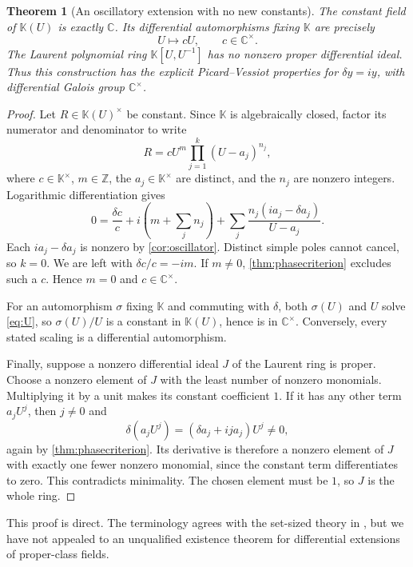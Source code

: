 \documentclass[11pt,letterpaper]{article}
\numberwithin{equation}{section}
\newtheorem{theorem}{Theorem}[section]
\theoremstyle{definition}
\theoremstyle{remark}
\newcommand{\K}{\mathbb K}
\newcommand{\C}{\mathbb C}
\newcommand{\Z}{\mathbb Z}
\begin{document}
\begin{theorem}[An oscillatory extension with no new constants]\label{thm:extension}
The constant field of $\K(U)$ is exactly $\C$. Its differential automorphisms fixing $\K$ are precisely
\[
 U\longmapsto cU,\qquad c\in\C^\times.
\]
The Laurent polynomial ring $\K[U,U^{-1}]$ has no nonzero proper differential ideal. Thus this construction has the explicit Picard--Vessiot properties for $\delta y=iy$, with differential Galois group $\C^\times$.
\end{theorem}
\begin{proof}
Let $R\in\K(U)^\times$ be constant. Since $\K$ is algebraically closed, factor its numerator and denominator to write
\[
 R=cU^m\prod_{j=1}^k(U-a_j)^{n_j},
\]
where $c\in\K^\times$, $m\in\Z$, the $a_j\in\K^\times$ are distinct, and the $n_j$ are nonzero integers. Logarithmic differentiation gives
\begin{equation}\label{eq:rationalconstant}
 0=\frac{\delta c}{c}
   +i\left(m+\sum_j n_j\right)
   +\sum_j\frac{n_j(ia_j-\delta a_j)}{U-a_j}.
\end{equation}
Each $ia_j-\delta a_j$ is nonzero by \cref{cor:oscillator}. Distinct simple poles cannot cancel, so $k=0$. We are left with $\delta c/c=-im$. If $m\ne0$, \cref{thm:phasecriterion} excludes such a $c$. Hence $m=0$ and $c\in\C^\times$.

For an automorphism $\sigma$ fixing $\K$ and commuting with $\delta$, both $\sigma(U)$ and $U$ solve \eqref{eq:U}, so $\sigma(U)/U$ is a constant in $\K(U)$, hence is in $\C^\times$. Conversely, every stated scaling is a differential automorphism.

Finally, suppose a nonzero differential ideal $J$ of the Laurent ring is proper. Choose a nonzero element of $J$ with the least number of nonzero monomials. Multiplying it by a unit makes its constant coefficient $1$. If it has any other term $a_jU^j$, then $j\ne0$ and
\[
 \delta(a_jU^j)=(\delta a_j+ij a_j)U^j\ne0,
\]
again by \cref{thm:phasecriterion}. Its derivative is therefore a nonzero element of $J$ with exactly one fewer nonzero monomial, since the constant term differentiates to zero. This contradicts minimality. The chosen element must be $1$, so $J$ is the whole ring.
\end{proof}

This proof is direct. The terminology agrees with the set-sized theory in \cite{Singer}, but we have not appealed to an unqualified existence theorem for differential extensions of proper-class fields.
\end{document}
